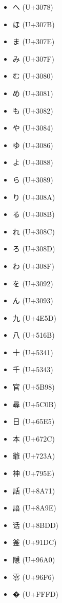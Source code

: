\documentclass[a4paper]{article}
\begin{document}
\begin{itemize}
    \item へ (U+3078)
    \item ほ (U+307B)
    \item ま (U+307E)
    \item み (U+307F)
    \item む (U+3080)
    \item め (U+3081)
    \item も (U+3082)
    \item や (U+3084)
    \item ゆ (U+3086)
    \item よ (U+3088)
    \item ら (U+3089)
    \item り (U+308A)
    \item る (U+308B)
    \item れ (U+308C)
    \item ろ (U+308D)
    \item わ (U+308F)
    \item を (U+3092)
    \item ん (U+3093)
    \item 九 (U+4E5D)
    \item 八 (U+516B)
    \item 十 (U+5341)
    \item 千 (U+5343)
    \item 官 (U+5B98)
    \item 尋 (U+5C0B)
    \item 日 (U+65E5)
    \item 本 (U+672C)
    \item 爺 (U+723A)
    \item 神 (U+795E)
    \item 話 (U+8A71)
    \item 語 (U+8A9E)
    \item 话 (U+8BDD)
    \item 釜 (U+91DC)
    \item 隠 (U+96A0)
    \item 零 (U+96F6)
    \item � (U+FFFD)

\end{itemize}
\end{document}
